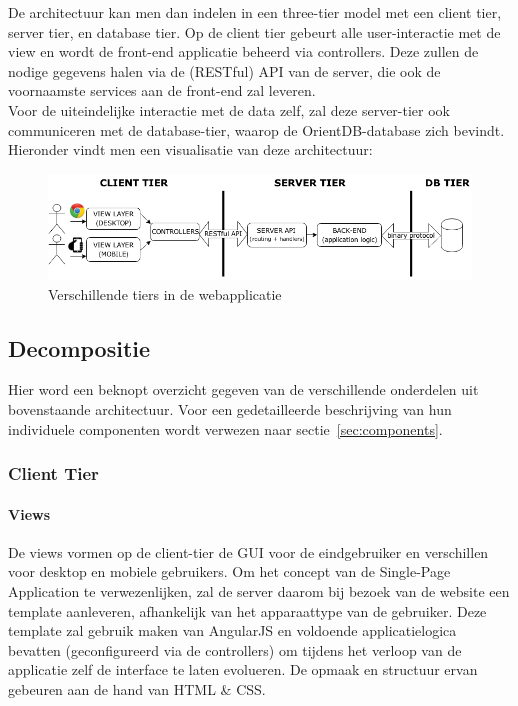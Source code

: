 \documentclass{article}
\begin{document}
De architectuur kan men dan indelen in een three-tier model met een client tier, server tier, en database tier. Op de client tier gebeurt alle user-interactie met de view en wordt de front-end applicatie beheerd via controllers. Deze zullen de nodige gegevens halen via de (RESTful) API van de server, die ook de voornaamste services aan de front-end zal leveren. \\ 
Voor de uiteindelijke interactie met de data zelf, zal deze server-tier ook communiceren met de database-tier, waarop de OrientDB-database zich bevindt. \\
Hieronder vindt men een visualisatie van deze architectuur:

\begin{figure}[!h]
\centering
 \includegraphics[width=140mm]{Architecture.png}
 \caption{Verschillende tiers in de webapplicatie}
 \label{Architecture}
\end{figure}

\subsection{Decompositie}

Hier word een beknopt overzicht gegeven van de verschillende onderdelen uit bovenstaande architectuur. Voor een gedetailleerde beschrijving van hun individuele componenten wordt verwezen naar sectie~\ref{sec:components}.

\subsubsection{Client Tier}

\paragraph{Views} 
De views vormen op de client-tier de GUI voor de eindgebruiker en verschillen voor desktop en mobiele gebruikers. Om het concept van de Single-Page Application te verwezenlijken, zal de server daarom bij bezoek van de website een template aanleveren, afhankelijk van het apparaattype van de gebruiker. Deze template zal gebruik maken van AngularJS en voldoende applicatielogica bevatten (geconfigureerd via de controllers) om tijdens het verloop van de applicatie zelf de interface te laten evolueren. De opmaak en structuur ervan gebeuren aan de hand van HTML \& CSS.
\end{document}
